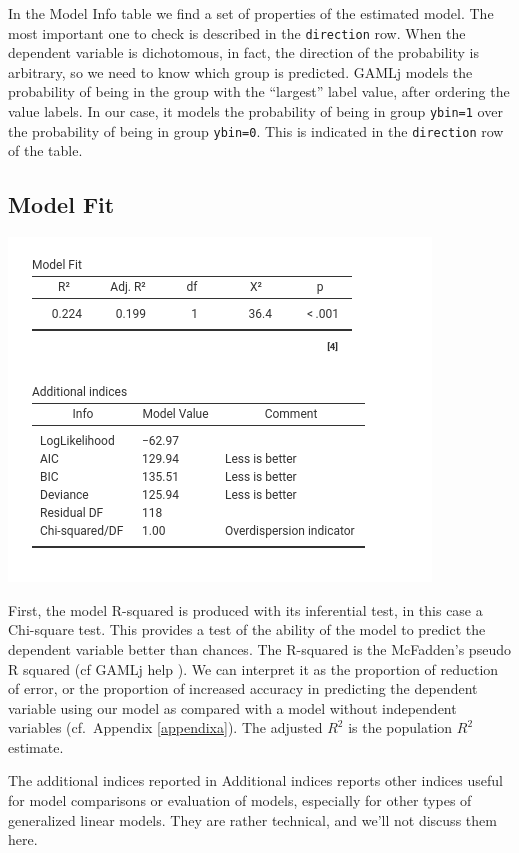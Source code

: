 \documentclass[
]{book}
\begin{document}
In the {Model Info} table we find a set of properties of the estimated model. The most important one to check is described in the \texttt{direction} row. When the dependent variable is dichotomous, in fact, the direction of the probability is arbitrary, so we need to know which group is predicted. {GAMLj} models the probability of being in the group with the ``largest'' label value, after ordering the value labels. In our case, it models the probability of being in group \texttt{ybin=1} over the probability of being in group \texttt{ybin=0}. This is indicated in the \texttt{direction} row of the table.

\hypertarget{model-fit}{%
\subsection{Model Fit}\label{model-fit}}

\includegraphics{bookletpics/3_logistic_output2.png}

First, the model R-squared is produced with its inferential test, in this case a Chi-square test. This provides a test of the ability of the model to predict the dependent variable better than chances. The R-squared is the McFadden's pseudo R squared (cf GAMLj help
). We can interpret it as the proportion of reduction of error, or the proportion of increased accuracy in predicting the dependent variable using our model as compared with a model without independent variables (cf.~Appendix \ref{appendixa}). The adjusted \(R^2\) is the population \(R^2\) estimate.

The additional indices reported in {Additional indices} reports other indices useful for model comparisons or evaluation of models, especially for other types of generalized linear models. They are rather technical, and we'll not discuss them here.
\end{document}
